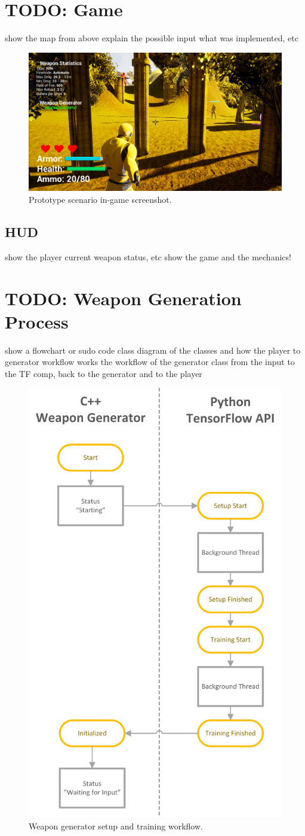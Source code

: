 \documentclass[MGS,Master,english]{twbook}%
\begin{document}
\section{TODO: Game}
show the map from above
explain the possible input
what was implemented, etc

\begin{figure}[!htbp]
	\centering
	\includegraphics[width=1.0\linewidth]{PICs/Prototype/ingame_screenshot}
	\caption{Prototype scenario in-game screenshot.}
\end{figure}


\subsection{HUD}
show the player current weapon status, etc
show the game and the mechanics!

\section{TODO: Weapon Generation Process}
show a flowchart or sudo code
class diagram of the classes and how the player to generator workflow works
the workflow of the generator class from the input to the TF comp, back to the generator and to the player

\begin{figure}[!htbp]
	\centering
	\includegraphics[width=0.5\linewidth]{PICs/WeaponGeneratorWorkflow_Setup_Training}
	\caption{Weapon generator setup and training workflow.}
\end{figure}
\end{document}
